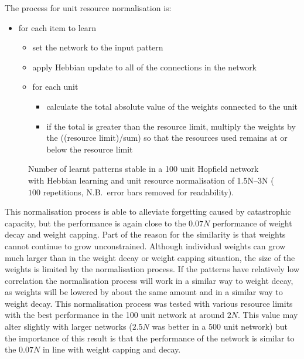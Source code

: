The process for unit resource normalisation is:
\begin{itemize}[topsep=1ex, leftmargin=1cm, labelsep=0.2cm, itemindent=0pt,label=\textbullet]
	\item for each item to learn
	\begin{itemize}[topsep=1ex, leftmargin=1cm, labelsep=0.2cm, itemindent=0pt,label=\textbullet]
		\item set the network to the input pattern
		\item apply Hebbian update to all of the connections in the network
		\item for each unit
		\begin{itemize}[topsep=1ex, leftmargin=1cm, labelsep=0.2cm, itemindent=0pt,label=\textbullet]
			\item calculate the total absolute value of the weights connected to the unit
			\item if the total is greater than the resource limit, multiply the weights by the ((resource limit)/sum) so that the resources used remains at or below the resource limit
		\end{itemize}
	\end{itemize}
\end{itemize}

\begin{figure}[tbp]
\small
\center
	
	\caption{Number of learnt patterns stable in a 100 unit Hopfield network  with Hebbian learning and unit resource normalisation of 1.5N--3N ($100$ repetitions, N.B.\ error bars removed for readability).}
	\label{fig:WeightNorm100num}
\end{figure}

This normalisation process is able to alleviate forgetting caused by catastrophic capacity, but the performance is again close to the $0.07N$ performance of weight decay and weight capping.  Part of the reason for the similarity is that weights cannot continue to grow unconstrained.  Although individual weights can grow much larger than in the weight decay or weight capping situation, the size of the weights is limited by the normalisation process.  If the patterns have relatively low correlation the normalisation process will work in a similar way to weight decay, as weights will be lowered by about the same amount and in a similar way to weight decay.  This normalisation process was tested with various resource limits with the best performance in the 100 unit network at around $2N$.  This value may alter slightly with larger networks ($2.5N$ was better in a 500 unit network) but the importance of this result is that the performance of the network is similar to the $0.07N$ in line with weight capping and decay.  


